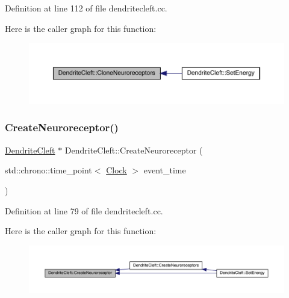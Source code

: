 Definition at line 112 of file dendritecleft.\+cc.

Here is the caller graph for this function\+:\nopagebreak
\begin{figure}[H]
\begin{center}
\leavevmode
\includegraphics[width=350pt]{class_dendrite_cleft_a93b542418482f3732380e33346e23bd2_icgraph}
\end{center}
\end{figure}
\mbox{\label{class_dendrite_cleft_ac84d3e0cafecd1436c34162f687e3851}} 
\subsubsection{\texorpdfstring{Create\+Neuroreceptor()}{CreateNeuroreceptor()}}
{\footnotesize\ttfamily \hyperlink{class_dendrite_cleft}{Dendrite\+Cleft} $\ast$ Dendrite\+Cleft\+::\+Create\+Neuroreceptor (\begin{DoxyParamCaption}\item[{std\+::chrono\+::time\+\_\+point$<$ \hyperlink{universe_8h_a0ef8d951d1ca5ab3cfaf7ab4c7a6fd80}{Clock} $>$}]{event\+\_\+time }\end{DoxyParamCaption})}



Definition at line 79 of file dendritecleft.\+cc.

Here is the caller graph for this function\+:\nopagebreak
\begin{figure}[H]
\begin{center}
\leavevmode
\includegraphics[width=350pt]{class_dendrite_cleft_ac84d3e0cafecd1436c34162f687e3851_icgraph}
\end{center}
\end{figure}
\mbox{\label{class_dendrite_cleft_ab34af5363b25c6498aee429725a1c7db}} 
